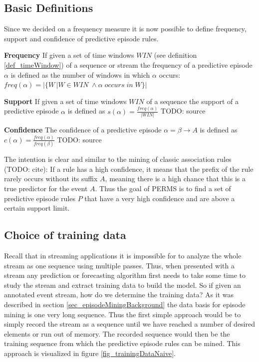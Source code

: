 \subsection{Basic Definitions}
Since we decided on a frequency measure it is now possible to define frequency, support and confidence of predictive episode rules.

\begin{mydef}
\label{def_frequency}
\textbf{Frequency} If given a set of time windows $WIN$ (see definition \ref{def_timeWindow}) of a sequence or stream the frequency of a predictive episode $\alpha$ is defined as the number of windows in which $\alpha$ occurs: $freq(\alpha) = |\{W\,|W \in WIN\; \land \alpha\; occurs \; in \; W\}|$
\end{mydef}

\begin{mydef}
\label{def_support}
\textbf{Support} If given a set of time windows $WIN$ of a sequence the support of a predictive episode $\alpha$ is defined as $s(\alpha) = \frac{freq(\alpha)}{|WIN|}$ TODO: source
\end{mydef}

\begin{mydef}
\label{def_confidence}
\textbf{Confidence} The confidence of a predictive episode $\alpha = \beta \rightarrow A$ is defined as $c(\alpha) = \frac{freq(\alpha)}{freq(\beta)}$ TODO: source
\end{mydef}

The intention is clear and similar to the mining of classic association rules (TODO: cite): If a rule has a high confidence, it means that the prefix of the rule rarely occurs without its suffix $A$, meaning there is a high chance that this is a true predictor for the event $A$. Thus the goal of PERMS is to find a set of predictive episode rules $P$ that have a very high confidence and are above a certain support limit.

\subsection{Choice of training data}
Recall that in streaming applications it is impossible for to analyze the whole stream as one sequence using multiple passes. Thus, when presented with a stream any prediction or forecasting algorithm first needs to take some time to study the stream and extract training data to build the model. So if given an annotated event stream, how do we determine the training data? As it was described in section \ref{sec_episodeMiningBackground} the data basis for episode mining is one very long sequence. Thus the first simple approach would be to simply record the stream as a sequence until we have reached a number of desired elements or run out of memory. The recorded sequence would then be the training sequence from which the predictive episode rules can be mined. This approach is visualized in figure \ref{fig_trainingDataNaive}.

